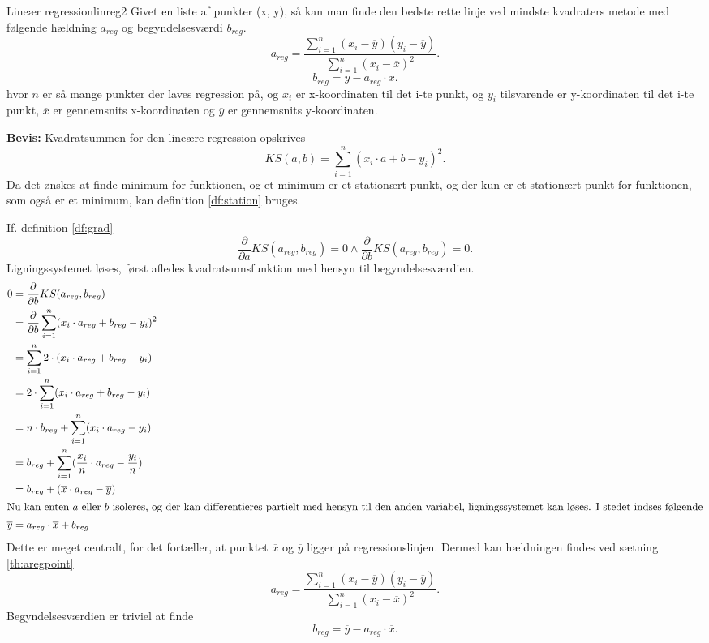 \documentclass{article}
\begin{document}
\begin{theorem}{Lineær regression}{linreg2}
	Givet en liste af punkter (x, y), så kan man finde den bedste rette linje
	ved mindste kvadraters metode med følgende hældning $a_{reg}$ og
	begyndelsesværdi $b_{reg}$.
	\[
		a_{reg} = \frac{\sum_{i=1}^n (x_i-\overline{y})(y_i-\overline{y})}{\sum_{i=1}^n (x_i-\overline{x})^2}.
	\] 
	\[
		b_{reg} = \overline{y} - a_{reg} \cdot \overline{x}.
	\] 
	hvor $n$ er så mange punkter der laves regression på, og $x_i$ er x-koordinaten
	til det i-te punkt, og $y_i$ tilsvarende er y-koordinaten til det i-te punkt,
	$\overline{x}$ er gennemsnits x-koordinaten og $\overline{y}$ er
	gennemsnits y-koordinaten.
\end{theorem}

\textbf{Bevis:}
Kvadratsummen for den lineære regression opskrives
\[
	KS(a, b) = \sum_{i=1}^n (x_i \cdot a + b - y_i)^2.
\] 
Da det ønskes at finde minimum for funktionen, og et minimum er et stationært
punkt, og der kun er et stationært punkt for funktionen, som også er et
minimum, kan definition \ref{df:station} bruges.

\smallskip

If. definition \ref{df:grad}
\[
	\frac{\partial}{\partial a} KS(a_{reg}, b_{reg}) = 0 \land
	\frac{\partial}{\partial b} KS(a_{reg}, b_{reg}) = 0.
\] 
Ligningssystemet løses, først afledes kvadratsumsfunktion med hensyn til
begyndelsesværdien.
\begin{align*}
	0 &= \frac{\partial}{\partial b} KS(a_{reg}, b_{reg})\\
	  &= \frac{\partial}{\partial b} \sum_{i=1}^n (x_i \cdot a_{reg} + b_{reg} - y_i)^2\\
	  &= \sum_{i=1}^n 2 \cdot (x_i \cdot a_{reg} + b_{reg} - y_i)\\
	  &= 2 \cdot \sum_{i=1}^n (x_i \cdot a_{reg} + b_{reg} - y_i)\\
	  &= n \cdot b_{reg} + \sum_{i=1}^n (x_i \cdot a_{reg} - y_i)\\
	  &= b_{reg} + \sum_{i=1}^n (\frac{x_i}{n} \cdot a_{reg} - \frac{y_i}{n})\\
	  &= b_{reg} + (\overline{x} \cdot a_{reg} - \overline{y})\\
	  \intertext{Nu kan enten $a$ eller $b$ isoleres, og der kan differentieres
		  partielt med hensyn til den anden variabel, ligningssystemet kan
	  løses. I stedet indses følgende}
	\overline{y} &= a_{reg} \cdot \overline{x} + b_{reg}
\end{align*}
Dette er meget centralt, for det fortæller, at punktet $\overline{x}$ og
$\overline{y}$ ligger på regressionslinjen. Dermed kan hældningen findes ved
sætning \ref{th:aregpoint}
\[
	a_{reg} = \frac{\sum_{i=1}^n (x_i-\overline{y})(y_i-\overline{y})}{\sum_{i=1}^n (x_i-\overline{x})^2}.
\] 
Begyndelsesværdien er triviel at finde
\[
	b_{reg} = \overline{y} - a_{reg} \cdot \overline{x}.
\] 
\end{document}
